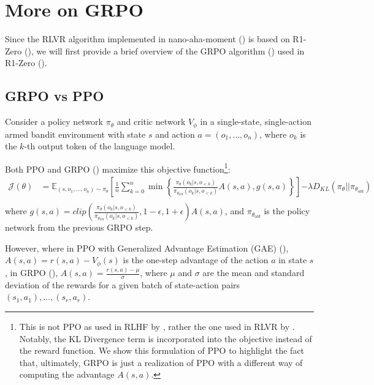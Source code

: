 \documentclass{article} %
\theoremstyle{definition}
\begin{document}
\section{More on GRPO}

Since the RLVR algorithm implemented in nano-aha-moment (\cite{nano-aha-moment}) is based on 
R1-Zero (\cite{r1}), we will first provide a brief overview of the GRPO
algorithm (\cite{grpo}) used in R1-Zero (\cite{r1}).

\subsection{GRPO vs PPO}
Consider a policy network $\pi_\theta$ and critic network $V_\phi$ in a single-state,
single-action armed bandit environment with state $s$ and action $a = (o_1, \dots, o_n)$,
where $o_k$ is the $k$-th output token of the language model.

Both PPO and GRPO (\cite{ppo, grpo}) maximize this objective function\footnote{
    This is not PPO as used in RLHF by \cite{InstructGPT-2022}, rather the one used in RLVR by \cite{grpo}.
    Notably, the KL Divergence term is incorporated into the objective instead of the reward function.
    We show this formulation of PPO to highlight the fact that, ultimately, GRPO is just a 
    realization of PPO with a different way of computing the advantage $A(s, a)$.
}:
\begin{equation}
    \label{eq:obj-fn}
    \begin{array}{rl}
        \mathcal{J}(\theta) &= \mathbb{E}_{(s, o_1, \dots, o_n) \sim \pi_\theta} \left[ 
            \displaystyle
            \frac{1}{n} \sum_{k = 0}^n \min \left\{
                \frac{\pi_\theta(o_k|s, o_{< k})}{\pi_{\theta_{old}}(o_k|s, o_{< k})} A(s, a),
                g(s, a)
            \right\}
        \right] {\displaystyle - \lambda D_{KL}(\pi_\theta || \pi_{\theta_{old}})} \\
    \end{array}
\end{equation}
where ${\displaystyle g(s, a) = clip\left(\frac{\pi_\theta(o_k|s, o_{< k})}{\pi_{\theta_{old}}(o_k|s, o_{< k})}, 1 - \epsilon, 1 + \epsilon \right) A(s, a)}$,
and $\pi_{\theta_{old}}$ is the policy network from the previous GRPO step.


However, where in PPO with Generalized Advantage Estimation (GAE) (\cite{ppo, gae}), $A(s, a) = r(s, a) - V_\phi(s)$ is the one-step advantage of the action $a$ in state $s$,
in GRPO (\cite{grpo}), $A(s, a) = \frac{r(s, a) - \mu}{\sigma}$, where $\mu$ and $\sigma$ are the mean and standard deviation of the rewards for a given batch of state-action
pairs $(s_1, a_1), \dots, (s_r, a_r)$.
\end{document}
